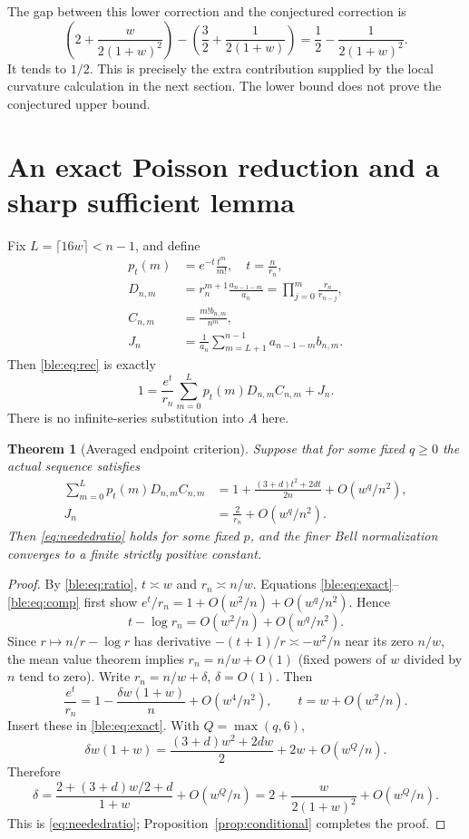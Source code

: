 \documentclass[11pt]{article}
\numberwithin{equation}{section}
\newtheorem{theorem}{Theorem}[section]
\theoremstyle{definition}
\theoremstyle{remark}
\begin{document}
The gap between this lower correction and the conjectured correction is
\[
 \left(2+\frac{w}{2(1+w)^2}\right)
 -\left(\frac32+\frac1{2(1+w)}\right)
 =\frac12-\frac1{2(1+w)^2}.
\]
It tends to $1/2$. This is precisely the extra contribution supplied by
the local curvature calculation in the next section. The lower bound does
not prove the conjectured upper bound.

\section{An exact Poisson reduction and a sharp sufficient lemma}\label{ble:sec:criterion}
Fix $L=\lceil16w\rceil<n-1$, and define
\begin{align}
 p_t(m)&=e^{-t}\frac{t^m}{m!},\quad t=\frac n{r_n},\label{ble:eq:p}\\
 D_{n,m}&=r_n^{m+1}\frac{a_{n-1-m}}{a_n}
          =\prod_{j=0}^{m}\frac{r_n}{r_{n-j}},\label{ble:eq:D}\\
 C_{n,m}&=\frac{m!b_{n,m}}{n^m},\label{ble:eq:C}\\
 J_n&=\frac1{a_n}\sum_{m=L+1}^{n-1}a_{n-1-m}b_{n,m}.\label{ble:eq:J}
\end{align}
Then \eqref{ble:eq:rec} is exactly
\begin{equation}\label{ble:eq:exact}
 1=\frac{e^t}{r_n}\sum_{m=0}^{L}p_t(m)D_{n,m}C_{n,m}+J_n.
\end{equation}
There is no infinite-series substitution into $A$ here.

\begin{theorem}[Averaged endpoint criterion]\label{ble:thm:criterion}
Suppose that for some fixed $q\ge0$ the actual sequence satisfies
\begin{align}
 \sum_{m=0}^{L}p_t(m)D_{n,m}C_{n,m}
 &=1+\frac{(3+d)t^2+2dt}{2n}+O(w^q/n^2),\label{ble:eq:avg}\\
 J_n&=\frac2{r_n}+O(w^q/n^2).\label{ble:eq:comp}
\end{align}
Then \eqref{eq:neededratio} holds for some fixed $p$, and the finer Bell
normalization converges to a finite strictly positive constant.
\end{theorem}
\begin{proof}
By \eqref{ble:eq:ratio}, $t\asymp w$ and $r_n\asymp n/w$. Equations
\eqref{ble:eq:exact}--\eqref{ble:eq:comp} first show
$e^t/r_n=1+O(w^2/n)+O(w^q/n^2)$. Hence
\[
 t-\log r_n=O(w^2/n)+O(w^q/n^2).
\]
Since $r\mapsto n/r-\log r$ has derivative $-(t+1)/r\asymp-w^2/n$ near its
zero $n/w$, the mean value theorem implies $r_n=n/w+O(1)$ (fixed powers of
$w$ divided by $n$ tend to zero).
Write $r_n=n/w+\delta$, $\delta=O(1)$. Then
\[
 \frac{e^t}{r_n}=1-\frac{\delta w(1+w)}n+O(w^4/n^2),\qquad
 t=w+O(w^2/n).
\]
Insert these in \eqref{ble:eq:exact}. With $Q=\max(q,6)$,
\[
 \delta w(1+w)=\frac{(3+d)w^2+2dw}{2}+2w+O(w^Q/n).
\]
Therefore
\[
 \delta=\frac{2+(3+d)w/2+d}{1+w}+O(w^Q/n)
       =2+\frac{w}{2(1+w)^2}+O(w^Q/n).
\]
This is \eqref{eq:neededratio}; Proposition~\ref{prop:conditional}
completes the proof.
\end{proof}
\end{document}
